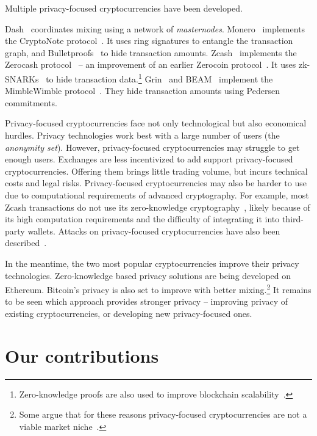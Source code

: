 Multiple privacy-focused cryptocurrencies have been developed.

Dash~\cite{Dash} coordinates mixing using a network of \textit{masternodes}.
Monero~\cite{Monero} implements the CryptoNote protocol~\cite{Saberhagen2013}.
It uses ring signatures to entangle the transaction graph, and Bulletproofs~\cite{Buenz2018} to hide transaction amounts.
Zcash~\cite{Zcash} implements the Zerocash protocol~\cite{BenSasson2014, Hopwood2020} -- an improvement of an earlier Zerocoin protocol~\cite{Miers2013}.
It uses zk-SNARKs~\cite{BenSasson2014a} to hide transaction data.\footnote{Zero-knowledge proofs are also used to improve blockchain scalability~\cite{Bonneau2020}.}
Grin~\cite{Grin} and BEAM~\cite{Beam} implement the MimbleWimble protocol~\cite{Jedusor2016}.
They hide transaction amounts using Pedersen commitments.

Privacy-focused cryptocurrencies face not only technological but also economical hurdles.
Privacy technologies work best with a large number of users (the \textit{anonymity set}).
However, privacy-focused cryptocurrencies may struggle to get enough users.
Exchanges are less incentivized to add support privacy-focused cryptocurrencies.
Offering them brings little trading volume, but incurs technical costs and legal risks.
Privacy-focused cryptocurrencies may also be harder to use due to computational requirements of advanced cryptography.
For example, most Zcash transactions do not use its zero-knowledge cryptography~\cite{Quesnelle2017, Biryukov2019c}, likely because of its high computation requirements and the difficulty of integrating it into third-party wallets.
Attacks on privacy-focused cryptocurrencies have also been described~\cite{Quesnelle2017, Moeser2018, Biryukov2019d, Biryukov2019e, Tramer2020}.

In the meantime, the two most popular cryptocurrencies improve their privacy technologies.
Zero-knowledge based privacy solutions are being developed on Ethereum.
Bitcoin's privacy is also set to improve with better mixing.\footnote{Some argue that for these reasons privacy-focused cryptocurrencies are not a viable market niche~\cite{Gentry2019}.}
It remains to be seen which approach provides stronger privacy -- improving privacy of existing cryptocurrencies, or developing new privacy-focused ones.



\section{Our contributions}


